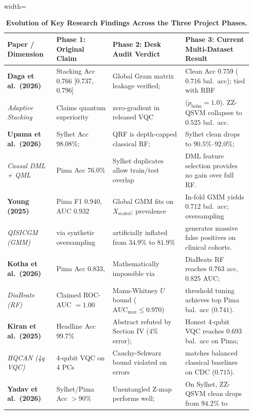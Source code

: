 \documentclass[11pt,a4paper]{article}
\begin{document}
\begin{table}[H]
\centering\footnotesize
\caption{\textbf{Evolution of Key Research Findings Across the Three Project Phases.}}
\label{tab:evolution}
\begin{adjustbox}{width=\textwidth}
\begin{tabular}{llll}
\toprule
\textbf{Paper / Dimension} & \textbf{Phase 1: Original Claim} & \textbf{Phase 2: Desk Audit Verdict} & \textbf{Phase 3: Current Multi-Dataset Result} \\
\midrule
\textbf{Daga et al.\ (2026)} & Stacking Acc $0.766$ [0.737, 0.796] & Global Gram matrix leakage verified; & Clean Acc $0.759$ ($0.716$ bal.\ acc); tied with RBF \\
\emph{Adaptive Stacking} & Claims quantum superiority & zero-gradient in released VQC & ($p_{\text{holm}}=1.0$). ZZ-QSVM collapses to $0.525$ bal.\ acc. \\
\addlinespace
\textbf{Upama et al.\ (2026)} & Sylhet Acc $98.08\%$; & QRF is depth-capped classical RF; & Sylhet clean drops to $90.5\%$--$92.0\%$; \\
\emph{Causal DML + QML} & Pima Acc $76.0\%$ & Sylhet duplicates allow train/test overlap & DML feature selection provides no gain over full RF. \\
\addlinespace
\textbf{Young (2025)} & Pima F1 $0.940$, AUC $0.932$ & Global GMM fits on $X_{\text{scaled}}$; prevalence & In-fold GMM yields $0.712$ bal.\ acc; oversampling \\
\emph{QISICGM (GMM)} & via synthetic oversampling & artificially inflated from $34.9\%$ to $81.9\%$ & generates massive false positives on clinical cohorts. \\
\addlinespace
\textbf{Kotha et al.\ (2026)} & Pima Acc $0.833$, & Mathematically impossible via & DiaBeats RF reaches $0.763$ acc, $0.825$ AUC; \\
\emph{DiaBeats (RF)} & Claimed ROC-AUC $= 1.00$ & Mann-Whitney $U$ bound ($\text{AUC}_{\max} \le 0.970$) & threshold tuning achieves top Pima bal.\ acc ($0.741$). \\
\addlinespace
\textbf{Kiran et al.\ (2025)} & Headline Acc $99.7\%$ & Abstract refuted by Section IV ($4\%$ error); & Honest 4-qubit VQC reaches $0.693$ bal.\ acc on Pima; \\
\emph{HQCAN (4q VQC)} & 4-qubit VQC on 4 PCs & Cauchy-Schwarz bound violated on errors & matches balanced classical baselines on CDC ($0.715$). \\
\addlinespace
\textbf{Yadav et al.\ (2026)} & Sylhet/Pima Acc $>90\%$ & Unentangled Z-map performs well; & On Sylhet, ZZ-QSVM clean drops from $94.2\%$ to \\

\end{tabular}
\end{adjustbox}
\end{table}
\end{document}
